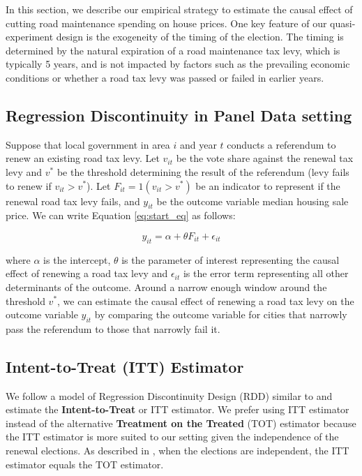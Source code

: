 In this section, we describe our empirical strategy to estimate the causal effect of cutting road maintenance spending on house prices. One key feature of our quasi-experiment design is the exogeneity of the timing of the election. The timing is determined by the natural expiration of a road maintenance tax levy, which is typically 5 years, and is not impacted by factors such as the prevailing economic conditions or whether a road tax levy was passed or failed in earlier years.

\subsection{Regression Discontinuity in Panel Data setting}

Suppose that local government in area $i$ and year $t$ conducts a referendum to renew an existing road tax levy. Let $v_{it}$ be the vote share against the renewal tax levy and  $v^*$ be the threshold determining the result of the referendum (levy fails to renew if $v_{it} > v^*$). Let $F_{it} = 1(v_{it} > v^*)$ be an indicator to represent if the renewal road tax levy fails, and $y_{it}$ be the outcome variable median housing sale price. We can write Equation \ref{eq:start_eq} as follows:

\begin{equation}
y_{it} = \alpha + \theta F_{it} + \epsilon_{it}
\label{eq:start_eq}
\end{equation}

\noindent where $\alpha$ is the intercept, $\theta$ is the parameter of interest representing the causal effect of renewing a road tax levy and $\epsilon_{it}$ is the error term representing all other determinants of the outcome. Around a narrow enough window around the threshold $v^*$, we can estimate the causal effect of renewing a road tax levy on the outcome variable $y_{it}$ by comparing the outcome variable for cities that narrowly pass the referendum to those that narrowly fail it.

\subsection{Intent-to-Treat (ITT) Estimator}

We follow a model of Regression Discontinuity Design (RDD) similar to \cite{cellini2010value} and estimate the {\bf Intent-to-Treat} or ITT estimator. We prefer using ITT estimator instead of the alternative {\bf Treatment on the Treated} (TOT) estimator because the ITT estimator is more suited to our setting given the independence of the renewal elections. As described in \cite{cellini2010value}, when the elections are independent, the ITT estimator equals the TOT estimator.

